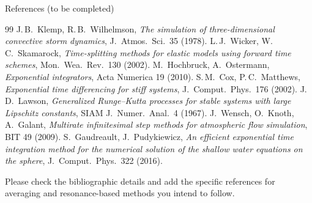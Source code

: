 \documentclass[aspectratio=169,10pt]{beamer}
\begin{document}
\begin{frame}[allowframebreaks]{References (to be completed)}
  \footnotesize
  \begin{thebibliography}{99}
     J.\,B.\ Klemp, R.\,B.\ Wilhelmson, \emph{The simulation of three-dimensional convective storm dynamics}, J.\ Atmos.\ Sci.\ 35 (1978).
     L.\,J.\ Wicker, W.\,C.\ Skamarock, \emph{Time-splitting methods for elastic models using forward time schemes}, Mon.\ Wea.\ Rev.\ 130 (2002).
     M.\ Hochbruck, A.\ Ostermann, \emph{Exponential integrators}, Acta Numerica 19 (2010).
     S.\,M.\ Cox, P.\,C.\ Matthews, \emph{Exponential time differencing for stiff systems}, J.\ Comput.\ Phys.\ 176 (2002).
     J.\,D.\ Lawson, \emph{Generalized Runge--Kutta processes for stable systems with large Lipschitz constants}, SIAM J.\ Numer.\ Anal.\ 4 (1967).
     J.\ Wensch, O.\ Knoth, A.\ Galant, \emph{Multirate infinitesimal step methods for atmospheric flow simulation}, BIT 49 (2009).
     S.\ Gaudreault, J.\ Pudykiewicz, \emph{An efficient exponential time integration method for the numerical solution of the shallow water equations on the sphere}, J.\ Comput.\ Phys.\ 322 (2016).
  \end{thebibliography}
  {\scriptsize Please check the bibliographic details and add the specific references for averaging and resonance-based methods you intend to follow.}
\end{frame}
\end{document}
